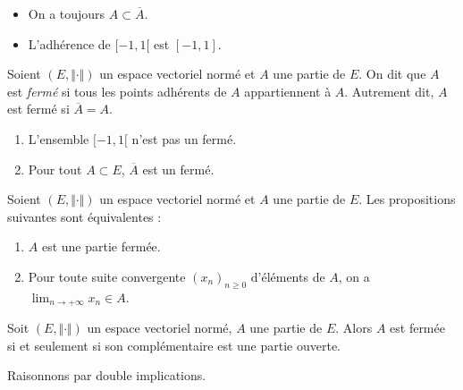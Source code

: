 \documentclass[french,11pt,twoside]{VcCours}
\begin{document}
\begin{Remarques}{}
\begin{itemize}
\item On a toujours $A \subset \overline{A}$.
\item L'adhérence de $[-1,1[$ est $[-1,1]$.
\end{itemize}
\end{Remarques}{}

\begin{Definition}{} Soient $(E, \Vert \cdot \Vert)$ un espace vectoriel normé et $A$ une partie de $E$. On dit que $A$ est \emph{fermé} si tous les points adhérents de $A$ appartiennent à $A$. Autrement dit, $A$ est fermé si $\overline{A}=A$.
\end{Definition}

\begin{Exemples}
\begin{enumerate}
\item L'ensemble $[-1,1[$ n'est pas un fermé.
\item Pour tout $A \subset E$, $\overline{A}$ est un fermé.
\end{enumerate}
\end{Exemples}

\begin{Proposition}{} Soient $(E, \Vert \cdot \Vert)$ un espace vectoriel normé et $A$ une partie de $E$. Les propositions suivantes sont équivalentes :
\begin{enumerate}
\item $A$ est une partie fermée.
\item Pour toute suite convergente $(x_n)_{n \geq 0}$ d'éléments de $A$, on a $\lim_{n \rightarrow + \infty} x_n \in A$.
\end{enumerate}
\end{Proposition}


\begin{Proposition}{} Soit $(E, \Vert \cdot \Vert)$ un espace vectoriel normé, $A$ une partie de $E$. Alors $A$ est fermée si et seulement si son complémentaire est une partie ouverte.
\end{Proposition}

\begin{Demonstration}{} Raisonnons par double implications.
%
%
%

\vspace*{10cm}
\end{Demonstration}
\end{document}
